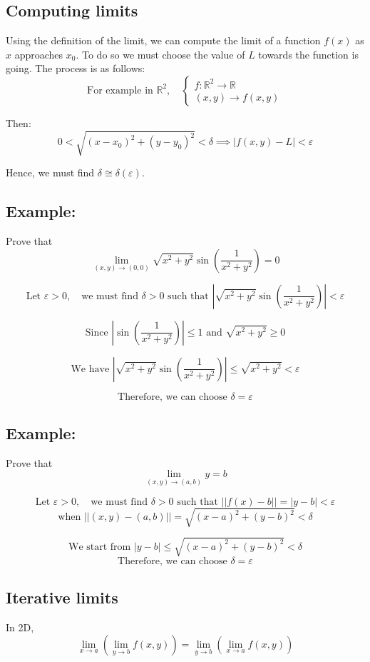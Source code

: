 \documentclass[11pt]{article}
\begin{document}
\subsection{Computing limits}
Using the definition of the limit, we can compute the limit of a function $f(x)$ as $x$ approaches $x_0$. To do so we must choose the value of $L$ towards the function is going. The process is as follows:
\[
\text{For example in } \mathbb{R}^2, \quad 
\begin{cases}
    f : \mathbb{R}^2 \rightarrow \mathbb{R} \\
    (x,y) \rightarrow f(x,y)
\end{cases}
\]

Then:
\[
0 < \sqrt{(x - x_0)^2 + (y - y_0)^2} < \delta \implies |f(x,y) - L| < \varepsilon
\]

Hence, we must find $\delta \cong \delta(\varepsilon)$.

\subsection*{Example:}
Prove that 
\[
\lim_{(x,y) \to (0,0)} \sqrt{x^2 + y^2} \sin\left(\frac{1}{x^2 + y^2}\right) = 0
\]

\[
\text{Let } \varepsilon > 0, \quad \text{we must find } \delta > 0 \text{ such that } \left|\sqrt{x^2 + y^2} \sin\left(\frac{1}{x^2 + y^2}\right)\right| < \varepsilon
\]

\[
\text{Since } \left|\sin\left(\frac{1}{x^2 + y^2}\right)\right| \leq 1 \text{ and } \sqrt{x^2 + y^2} \geq 0
\]

\[
\text{We have } \left|\sqrt{x^2 + y^2} \sin\left(\frac{1}{x^2 + y^2}\right)\right| \leq \sqrt{x^2 + y^2} < \varepsilon
\]

\[
\text{Therefore, we can choose } \delta = \varepsilon
\]

\subsection*{Example:}
Prove that
\[
\lim_{(x,y) \to (a,b)} y = b
\]

\[
\text{Let } \varepsilon > 0, \quad \text{we must find } \delta > 0 \text{ such that } ||f(x) - b|| = |y - b| < \varepsilon
\]
\[
\text{when } ||(x,y) - (a,b)|| = \sqrt{(x-a)^2 + (y-b)^2} < \delta
\]

\[
\text{We start from } |y - b| \leq \sqrt{(x-a)^2 + (y-b)^2} < \delta
\]
\[
\text{Therefore, we can choose } \delta = \varepsilon
\]

\subsection{Iterative limits}
In 2D, 
\[
\lim_{x \to a} \left(\lim_{y \to b} f(x,y)\right) = \lim_{y \to b} \left(\lim_{x \to a} f(x,y)\right)
\]
\end{document}
